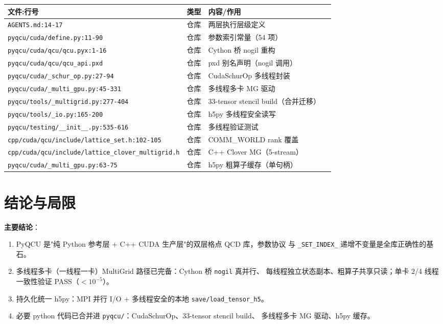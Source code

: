 \documentclass[UTF8]{ctexart}
\begin{document}
\begin{center}
\begin{tabular}{llll}
\toprule
文件:行号 & 类型 & 内容/作用 \\
\midrule
\texttt{AGENTS.md:14-17} & 仓库 & 两层执行层级定义 \\
\texttt{pyqcu/cuda/define.py:11-90} & 仓库 & 参数索引常量（54 项）\\
\texttt{pyqcu/cuda/qcu/qcu.pyx:1-16} & 仓库 & Cython 桥 nogil 重构 \\
\texttt{pyqcu/cuda/qcu/qcu\_api.pxd} & 仓库 & pxd 别名声明（nogil 调用）\\
\texttt{pyqcu/cuda/\_schur\_op.py:27-94} & 仓库 & CudaSchurOp 多线程封装 \\
\texttt{pyqcu/cuda/\_multi\_gpu.py:45-331} & 仓库 & 多线程多卡 MG 驱动 \\
\texttt{pyqcu/tools/\_multigrid.py:277-404} & 仓库 & 33-tensor stencil build（合并迁移）\\
\texttt{pyqcu/tools/\_io.py:165-200} & 仓库 & h5py 多线程安全读写 \\
\texttt{pyqcu/testing/\_\_init\_\_.py:535-616} & 仓库 & 多线程验证测试 \\
\texttt{cpp/cuda/qcu/include/lattice\_set.h:102-105} & 仓库 & COMM\_WORLD rank 覆盖 \\
\texttt{cpp/cuda/qcu/include/lattice\_clover\_multigrid.h} & 仓库 & C++ Clover MG（5-stream）\\
\texttt{pyqcu/cuda/\_multi\_gpu.py:63-75} & 仓库 & h5py 粗算子缓存（单句柄）\\
\bottomrule
\end{tabular}
\end{center}

\section{结论与局限}

\begin{conclbox}
\textbf{主要结论}：
\begin{enumerate}
  \item PyQCU 是"纯 Python 参考层 + C++ CUDA 生产层"的双层格点 QCD 库，参数协议
        与 \texttt{\_SET\_INDEX\_} 递增不变量是全库正确性的基石。
  \item 多线程多卡（一线程一卡）MultiGrid 路径已完备：Cython 桥 \texttt{nogil} 真并行、
        每线程独立状态副本、粗算子共享只读；单卡 2/4 线程一致性验证 PASS（$<10^{-5}$）。
  \item 持久化统一 h5py：MPI 并行 I/O + 多线程安全的本地 \texttt{save/load\_tensor\_h5}。
  \item 必要 python 代码已合并进 \texttt{pyqcu/}：CudaSchurOp、33-tensor stencil build、
        多线程多卡 MG 驱动、h5py 缓存。
\end{enumerate}
\end{conclbox}
\end{document}
